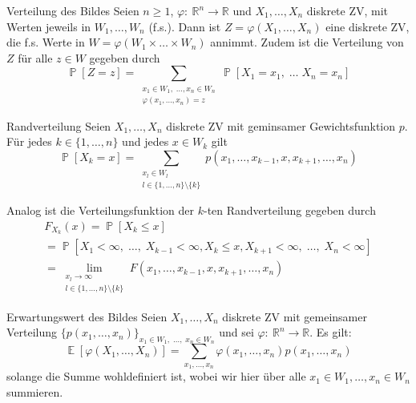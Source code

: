 \documentclass[a4paper,10pt]{article}
\def\R{\mathbb{R}}
\renewcommand{\P}{\operatorname{\mathbb{P}}}
\DeclareMathOperator{\E}{\mathbb{E}}
\numberwithin{equation}{section}
\begin{document}
\begin{mainbox}{Verteilung des Bildes}
    Seien \( n \geq 1 \), \( \varphi: \: \R^n \to \R \) und \( X_1, \dots, X_n \) diskrete ZV, mit Werten jeweils in \( W_1, \dots, W_n \) (f.s.). Dann ist \( Z = \varphi(X_1, \dots, X_n) \) eine diskrete ZV, die f.s. Werte in \( W = \varphi(W_1 \times \dots \times W_n) \) annimmt. Zudem ist die Verteilung von \( Z \) für alle \( z \in W \) gegeben durch
    \[
        \P[Z = z] = \sum_{\substack{x_1 \in W_1, \; \dots, x_n \in W_n \\ \varphi(x_1, \dots, x_n) = z}} \P[X_1 = x_1, \; \dots \; X_n = x_n]
    \]
\end{mainbox}


\begin{mainbox}{Randverteilung}
    Seien \( X_1, \dots, X_n \) diskrete ZV mit geminsamer Gewichtsfunktion \( p \). Für jedes \( k \in \{1, \dots, n\} \) und jedes \( x \in W_k \) gilt
    \[
        \P[X_k = x] = \sum_{\substack{x_l \in W_l \\ l \in \{1, \dots, n\} \setminus \{k\}}} p(x_1, \dots, x_{k - 1}, x, x_{k + 1}, \dots, x_n)
    \]
\end{mainbox}

Analog ist die Verteilungsfunktion der \( k \)-ten Randverteilung gegeben durch
\begin{multline*}
    F_{X_k}(x)
    = \P[X_k \leq x] \\
    = \P[X_1 < \infty, \; \dots, \; X_{k - 1} < \infty,
        X_k \leq x,
        X_{k + 1} < \infty, \; \dots, \; X_n < \infty] \\
    = \lim_{\substack{x_l \to \infty \\ l \in \{1, \dots, n\} \setminus \{k\}}} F(x_1, \dots, x_{k - 1}, x, x_{k + 1}, \dots, x_n)
\end{multline*}

\begin{mainbox}{Erwartungswert des Bildes}
    Seien \( X_1, \dots, X_n \) diskrete ZV mit gemeinsamer Verteilung \( \{p(x_1, \dots, x_n)\}_{x_1 \in W_1, \; \dots, \; x_n \in W_n} \) und sei \( \varphi: \: \R^n \to \R \). Es gilt:
    \[
        \E[\varphi(X_1, \dots, X_n)] = \sum_{x_1, \dots, x_n} \varphi(x_1, \dots, x_n) p(x_1, \dots, x_n)
    \]
    solange die Summe wohldefiniert ist, wobei wir hier über alle \( x_1 \in W_1, \dots, x_n \in W_n \) summieren.
\end{mainbox}
\end{document}
